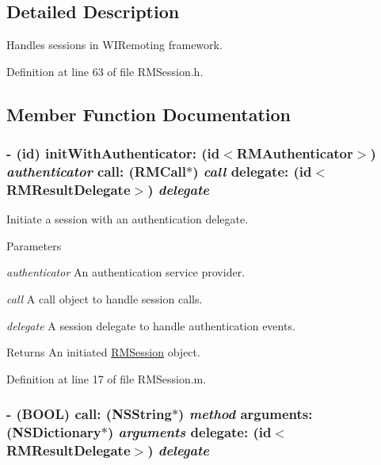 \subsection{Detailed Description}
Handles sessions in WIRemoting framework. 

Definition at line 63 of file RMSession.h.

\subsection{Member Function Documentation}
\hypertarget{interface_r_m_session_ac0cd1eaf70a3afee073b376773d915ff}{
\subsubsection[{initWithAuthenticator:call:delegate:}]{\setlength{\rightskip}{0pt plus 5cm}-\/ (id) initWithAuthenticator: (id$<${\bf RMAuthenticator}$>$) {\em authenticator}\/ call: ({\bf RMCall}$\ast$) {\em call}\/ delegate: (id$<${\bf RMResultDelegate}$>$) {\em delegate}}}
\label{interface_r_m_session_ac0cd1eaf70a3afee073b376773d915ff}


Initiate a session with an authentication delegate. 
\begin{DoxyParams}{Parameters}
\item[{\em authenticator}]An authentication service provider. \item[{\em call}]A call object to handle session calls. \item[{\em delegate}]A session delegate to handle authentication events.\end{DoxyParams}
\begin{DoxyReturn}{Returns}
An initiated \hyperlink{interface_r_m_session}{RMSession} object. 
\end{DoxyReturn}


Definition at line 17 of file RMSession.m.\hypertarget{interface_r_m_session_a898ba9b048b6568b051acde8d2f48749}{
\subsubsection[{call:arguments:delegate:}]{\setlength{\rightskip}{0pt plus 5cm}-\/ (BOOL) call: ({\bf NSString}$\ast$) {\em method}\/ arguments: (NSDictionary$\ast$) {\em arguments}\/ delegate: (id$<${\bf RMResultDelegate}$>$) {\em delegate}}}
\label{interface_r_m_session_a898ba9b048b6568b051acde8d2f48749}


